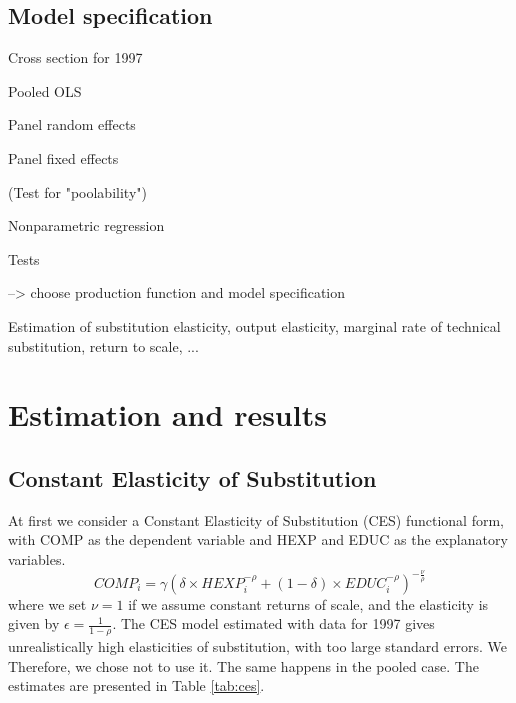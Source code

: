 \documentclass[12pt,a4paper]{article}\usepackage[]{graphicx}\usepackage[]{color}
\begin{document}
\subsection{Model specification}








Cross section for 1997

Pooled OLS

Panel random effects

Panel fixed effects

(Test for "poolability")

Nonparametric regression

Tests

--> choose production function and model specification

Estimation of substitution elasticity, output elasticity, marginal rate of technical substitution, return to scale, ...












\section{Estimation and results}





\subsection{Constant Elasticity of Substitution}
At first we consider a Constant Elasticity of Substitution (CES) functional form, with COMP as the dependent variable and HEXP and EDUC as the explanatory variables.
\begin{equation}
COMP_i = \gamma \left( \delta \times HEXP_i^{-\rho} + (1- \delta) \times EDUC_i^{-\rho} \right)^{-\frac{\nu}{\rho}}
\end{equation}
where we set $\nu = 1$ if we assume constant returns of scale, and the elasticity is given by $\epsilon = \frac{1}{1- \rho}$. The CES model estimated with data for 1997 gives unrealistically high elasticities of substitution, with too large standard errors. We Therefore, we chose not to use it. The same happens in the pooled case. The estimates are presented in Table \ref{tab:ces}.

\end{document}
